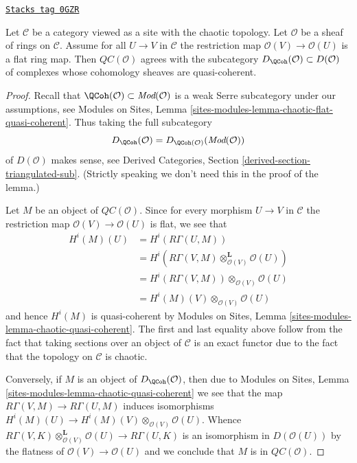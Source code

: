\begin{lemma}
\label{sites-cohomology-lemma-cartesian-flat-quasi-coherent}
\href{https://stacks.math.columbia.edu/tag/0GZR}{\texttt{Stacks tag 0GZR}}

Let $\mathcal{C}$ be a category viewed as a site with the chaotic
topology. Let $\mathcal{O}$ be a sheaf of rings on $\mathcal{C}$.
Assume for all $U \to V$ in $\mathcal{C}$ the restriction map
$\mathcal{O}(V) \to \mathcal{O}(U)$ is a flat ring map.
Then $\mathit{QC}(\mathcal{O})$ agrees with the subcategory
$D_\QCoh(\mathcal{O}) \subset D(\mathcal{O})$ of complexes
whose cohomology sheaves are quasi-coherent.
\end{lemma}

\begin{proof}
Recall that $\QCoh(\mathcal{O}) \subset \textit{Mod}(\mathcal{O})$
is a weak Serre subcategory under our assumptions, see
Modules on Sites, Lemma \ref{sites-modules-lemma-chaotic-flat-quasi-coherent}.
Thus taking the full subcategory
$$
D_\QCoh(\mathcal{O}) = D_{\QCoh(\mathcal{O})}(\textit{Mod}(\mathcal{O}))
$$
of $D(\mathcal{O})$ makes sense, see Derived Categories, Section
\ref{derived-section-triangulated-sub}. (Strictly speaking we don't need
this in the proof of the lemma.)

\medskip\noindent
Let $M$ be an object of $\mathit{QC}(\mathcal{O})$. Since for every
morphism $U \to V$ in $\mathcal{C}$ the restriction map
$\mathcal{O}(V) \to \mathcal{O}(U)$ is flat, we see that
\begin{align*}
H^i(M)(U)
& =
H^i(R\Gamma(U, M)) \\
& =
H^i(R\Gamma(V, M) \otimes_{\mathcal{O}(V)}^\mathbf{L} \mathcal{O}(U)) \\
& =
H^i(R\Gamma(V, M)) \otimes_{\mathcal{O}(V)} \mathcal{O}(U) \\
& =
H^i(M)(V) \otimes_{\mathcal{O}(V)} \mathcal{O}(U)
\end{align*}
and hence $H^i(M)$ is quasi-coherent by
Modules on Sites, Lemma \ref{sites-modules-lemma-chaotic-quasi-coherent}.
The first and last equality above follow from the fact that
taking sections over an object of $\mathcal{C}$ is an exact functor
due to the fact that the topology on $\mathcal{C}$ is chaotic.

\medskip\noindent
Conversely, if $M$ is an object of $D_\QCoh(\mathcal{O})$, then due to
Modules on Sites, Lemma \ref{sites-modules-lemma-chaotic-quasi-coherent}
we see that the map $R\Gamma(V, M) \to R\Gamma(U, M)$ induces isomorphisms
$H^i(M)(U) \to H^i(M)(V) \otimes_{\mathcal{O}(V)} \mathcal{O}(U)$.
Whence $R\Gamma(V, K) \otimes_{\mathcal{O}(V)}^\mathbf{L} \mathcal{O}(U)
\to R\Gamma(U, K)$ is an isomorphism in $D(\mathcal{O}(U))$ by the flatness
of $\mathcal{O}(V) \to \mathcal{O}(U)$ and we
conclude that $M$ is in $\mathit{QC}(\mathcal{O})$.
\end{proof}

